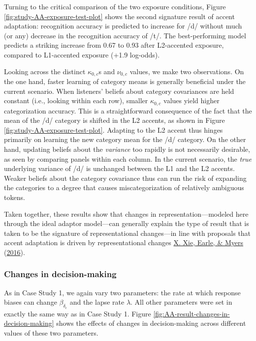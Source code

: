 \documentclass[
  11pt,
  english,
  man,floatsintext]{apa6}
\begin{document}
Turning to the critical comparison of the two exposure conditions, Figure \ref{fig:study-AA-exposure-test-plot} shows the second signature result of accent adaptation: recognition accuracy is predicted to increase for /d/ without much (or any) decrease in the recognition accuracy of /t/. The best-performing model predicts a striking increase from 0.67 to 0.93 after L2-accented exposure, compared to L1-accented exposure (+1.9 log-odds).

Looking across the distinct \(\kappa_{0,c}\)s and \(\nu_{0,c}\) values, we make two observations. On the one hand, faster learning of category means is generally beneficial under the current scenario. When listeners' beliefs about category covariances are held constant (i.e., looking within each row), smaller \(\kappa_{0,c}\) values yield higher categorization accuracy. This is a straightforward consequence of the fact that the mean of the /d/ category is shifted in the L2 accents, as shown in Figure \ref{fig:study-AA-exposure-test-plot}. Adapting to the L2 accent thus hinges primarily on learning the new category mean for the /d/ category. On the other hand, updating beliefs about the \emph{variance} too rapidly is not necessarily desirable, as seen by comparing panels within each column. In the current scenario, the \emph{true} underlying variance of /d/ is unchanged between the L1 and the L2 accents. Weaker beliefs about the category covariance thus can run the risk of expanding the categories to a degree that causes miscategorization of relatively ambiguous tokens.

Taken together, these results show that changes in representation---modeled here through the ideal adaptor model---can generally explain the type of result that is taken to be the signature of representational changes---in line with proposals that accent adaptation is driven by representational changes \protect\hyperlink{ref-xie2016}{X. Xie, Earle, \& Myers} (\protect\hyperlink{ref-xie2016}{2016}).

\hypertarget{changes-in-decision-making-1}{%
\subsubsection{Changes in decision-making}\label{changes-in-decision-making-1}}

As in Case Study 1, we again vary two parameters: the rate at which response biases can change \(\beta_{\delta_\epsilon}\) and the lapse rate \(\lambda\). All other parameters were set in exactly the same way as in Case Study 1. Figure \ref{fig:AA-result-changes-in-decision-making} shows the effects of changes in decision-making across different values of these two parameters.
\end{document}
